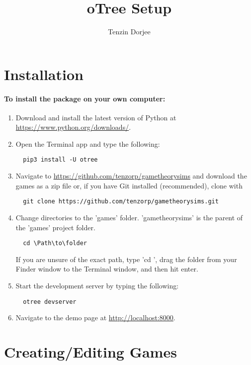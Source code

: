 \documentclass{article}
\title{oTree Setup}
\author{Tenzin Dorjee}
\begin{document}
	\maketitle
	\newpage
	\tableofcontents
	\newpage
	
	\section{Installation}
		\paragraph{To install the package on your own computer:}
			\begin{enumerate}
				\item Download and install the latest version of Python at \url{https://www.python.org/downloads/}.
				\item Open the Terminal app and type the following:
					\begin{lstlisting}
  pip3 install -U otree
					\end{lstlisting}
				\item Navigate to \url{https://github.com/tenzorp/gametheorysims} and download the games as a zip file or, if you have Git installed (recommended), clone with 
					\begin{lstlisting}
  git clone https://github.com/tenzorp/gametheorysims.git
					\end{lstlisting}
				\item Change directories to the 'games' folder. 'gametheorysims' is the parent of the 'games' project folder.
					\begin{lstlisting}
  cd \Path\to\folder
					\end{lstlisting}
					If you are unsure of the exact path, type 'cd ', drag the folder from your Finder window to the Terminal window, and then hit enter.
				\item Start the development server by typing the following:
				\begin{lstlisting}
  otree devserver
				\end{lstlisting}
				\item Navigate to the demo page at \url{http://localhost:8000}.
  			\end{enumerate}
  		
  		
	\section{Creating/Editing Games}
\end{document}
